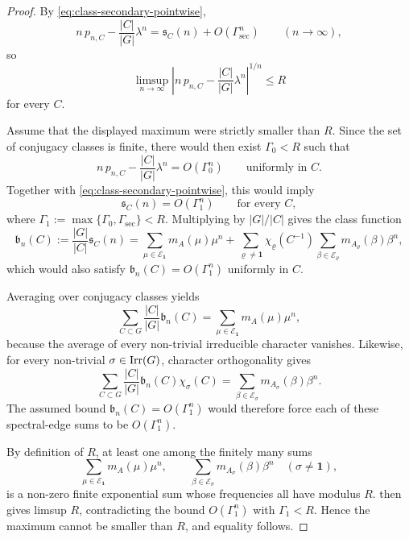 \begin{proof}
  By \eqref{eq:class-secondary-pointwise},
  \[
    n\,p_{n,C}-\frac{|C|}{|G|}\lambda^n
    =
    \mathfrak s_C(n)+O(\Gamma_{\mathrm{sec}}^n)
    \qquad (n\to\infty),
  \]
  so
  \[
    \limsup_{n\to\infty}
      \left|
        n\,p_{n,C}-\frac{|C|}{|G|}\lambda^n
      \right|^{1/n}
    \le R
  \]
  for every \(C\).

  Assume that the displayed maximum were strictly smaller than \(R\).
  Since the set of conjugacy classes is finite, there would then exist
  \(\Gamma_0<R\) such that
  \[
    n\,p_{n,C}-\frac{|C|}{|G|}\lambda^n
    =O(\Gamma_0^n)
    \qquad\text{uniformly in } C.
  \]
  Together with \eqref{eq:class-secondary-pointwise}, this would imply
  \[
    \mathfrak s_C(n)=O(\Gamma_1^n)
    \qquad\text{for every } C,
  \]
  where \(\Gamma_1:=\max\{\Gamma_0,\Gamma_{\mathrm{sec}}\}<R\).
  Multiplying by \(|G|/|C|\) gives the class function
  \[
    \mathfrak b_n(C)
    :=
    \frac{|G|}{|C|}\mathfrak s_C(n)
    =
    \sum_{\mu\in\mathcal E_{\mathbf 1}}m_A(\mu)\mu^n
    +
    \sum_{\varrho\neq\mathbf 1}\chi_\varrho(C^{-1})
      \sum_{\beta\in\mathcal E_\varrho}m_{A_\varrho}(\beta)\beta^n,
  \]
  which would also satisfy \(\mathfrak b_n(C)=O(\Gamma_1^n)\)
  uniformly in \(C\).

  Averaging over conjugacy classes yields
  \[
    \sum_{C\subset G}\frac{|C|}{|G|}\mathfrak b_n(C)
    =
    \sum_{\mu\in\mathcal E_{\mathbf 1}}m_A(\mu)\mu^n,
  \]
  because the average of every non-trivial irreducible character
  vanishes. Likewise, for every non-trivial \(\sigma\in\operatorname{Irr}(G)\),
  character orthogonality gives
  \[
    \sum_{C\subset G}\frac{|C|}{|G|}\mathfrak b_n(C)\chi_\sigma(C)
    =
    \sum_{\beta\in\mathcal E_\sigma}m_{A_\sigma}(\beta)\beta^n.
  \]
  The assumed bound \(\mathfrak b_n(C)=O(\Gamma_1^n)\) would therefore
  force each of these spectral-edge sums to be \(O(\Gamma_1^n)\).

  By definition of \(R\), at least one among the finitely many sums
  \[
    \sum_{\mu\in\mathcal E_{\mathbf 1}}m_A(\mu)\mu^n,
    \qquad
    \sum_{\beta\in\mathcal E_\sigma}m_{A_\sigma}(\beta)\beta^n
    \quad (\sigma\neq\mathbf 1),
  \]
  is a non-zero finite exponential sum whose frequencies all have
  modulus \(R\).  then
  gives limsup \(R\), contradicting the bound \(O(\Gamma_1^n)\) with
  \(\Gamma_1<R\). Hence the maximum cannot be smaller than \(R\), and
  equality follows.
\end{proof}

